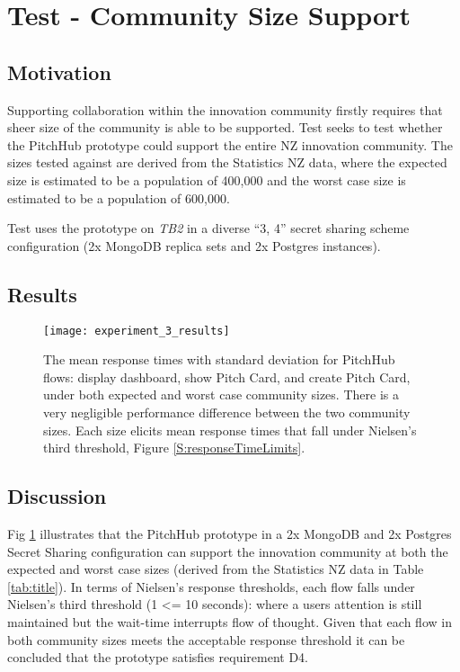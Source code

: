 \section{Test  - Community Size Support}

\subsection{Motivation}
Supporting collaboration within the innovation community firstly requires that sheer size of the community is able to be supported. Test  seeks to test whether the PitchHub prototype could support the entire NZ innovation community. The sizes tested against are derived from the Statistics NZ data, where the expected size is estimated to be a population of 400,000 and the worst case size is estimated to be a population of 600,000.

Test  uses the prototype on \textit{TB2} in a diverse ``3, 4'' secret sharing scheme configuration (2x MongoDB replica sets and 2x Postgres instances).

\subsection{Results}

\begin{figure}[H]
    \centering
    \texttt{[image: experiment\_3\_results]}
    \caption{The mean response times with standard deviation for PitchHub flows: display dashboard, show Pitch Card, and create Pitch Card, under both expected and worst case community sizes. There is a very negligible performance difference between the two community sizes. Each size elicits mean response times that fall under Nielsen's third threshold, Figure \ref{S:responseTimeLimits}. }
    \label{fig:test_3_results}
\end{figure}

\subsection{Discussion}

Fig \ref{fig:test_3_results} illustrates that the PitchHub prototype in a 2x MongoDB and 2x Postgres Secret Sharing configuration can support the innovation community at both the expected and worst case sizes (derived from the Statistics NZ data in Table \ref{tab:title}). In terms of Nielsen's response thresholds, each flow falls under Nielsen's third threshold (1 \textless= 10 seconds): where a users attention is still maintained but the wait-time interrupts flow of thought. Given that each flow in both community sizes meets the acceptable response threshold it can be concluded that the prototype satisfies requirement D4.

